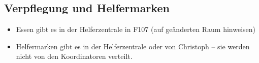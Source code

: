 \subsection{Verpflegung und Helfermarken}
\begin{itemize}
    \item Essen gibt es in der Helferzentrale in F107 (auf geänderten Raum hinweisen)
    \item Helfermarken gibt es in der Helferzentrale oder von Christoph -- sie werden nicht von den Koordinatoren verteilt.
\end{itemize}
